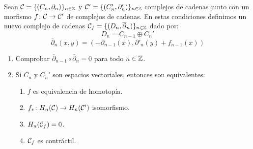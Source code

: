 \documentclass[HS.tex]{subfiles}
\begin{document}
\begin{prop}
Sean $\mathcal{C} = \{(C_n, \partial_n)\}_{n \in \mathbb{Z}}$ y $\mathcal{C}' = \{(C_n',\partial_n')\}_{n \in \mathbb{Z}}$ complejos de cadenas junto con un morfismo $f \colon \mathcal{C} \to \mathcal{C}'$ de complejos de cadenas. En estas condiciones definimos un nuevo complejo de cadenas $\mathcal{C}_f = \{(D_n,\overline{\partial}_n)\}_{n \in \mathbb{Z}}$ dado por:
\[ D_n = C_{n-1} \oplus C_n' \]
\[ \overline{\partial}_n (x,y) = (-\partial_{n-1}(x), \partial'_n(y) + f_{n-1}(x)) \]
\begin{enumerate}
\item Comprobar $\overline{\partial}_{n-1} \circ \overline{\partial}_n = 0$ para todo $n \in \mathbb{Z}$.
\item Si $C_n$ y $C_n'$ son espacios vectoriales, entonces son equivalentes:
\begin{enumerate}[i]
\item $f$ es equivalencia de homotopía.
\item $f_* \colon H_n(\mathcal{C}) \to H_n(\mathcal{C}')$ isomorfismo.
\item $H_n(\mathcal{C}_f) = 0$.
\item $\mathcal{C}_f$ es contráctil.
\end{enumerate}
\end{enumerate}
\end{prop}
\end{document}
